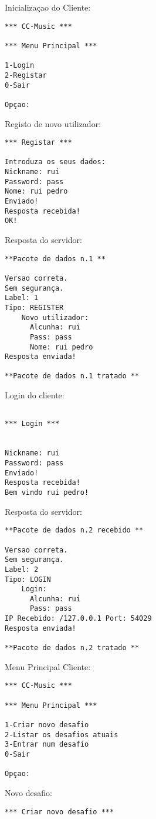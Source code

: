 \begin{multicols}{2}{
\scriptsize
Inicializaçao do Cliente:
\begin{verbatim}
*** CC-Music ***

*** Menu Principal ***

1-Login
2-Registar
0-Sair

Opçao: 
\end{verbatim}

Registo de novo utilizador:
\begin{verbatim}
*** Registar ***

Introduza os seus dados:
Nickname: rui
Password: pass
Nome: rui pedro
Enviado!
Resposta recebida!
OK!
\end{verbatim}

Resposta do servidor:
\begin{verbatim}
**Pacote de dados n.1 **

Versao correta.
Sem segurança.
Label: 1
Tipo: REGISTER
    Novo utilizador:
      Alcunha: rui
      Pass: pass
      Nome: rui pedro
Resposta enviada!

**Pacote de dados n.1 tratado **
\end{verbatim}

Login do cliente:
\begin{verbatim}

*** Login ***


Nickname: rui
Password: pass
Enviado!
Resposta recebida!
Bem vindo rui pedro!
\end{verbatim}

Resposta do servidor:
\begin{verbatim}
**Pacote de dados n.2 recebido **

Versao correta.
Sem segurança.
Label: 2
Tipo: LOGIN
    Login:
      Alcunha: rui
      Pass: pass
IP Recebido: /127.0.0.1 Port: 54029
Resposta enviada!

**Pacote de dados n.2 tratado **
\end{verbatim}

Menu Principal Cliente:
\begin{verbatim}
*** CC-Music ***

*** Menu Principal ***

1-Criar novo desafio
2-Listar os desafios atuais
3-Entrar num desafio
0-Sair

Opçao: 
\end{verbatim}

Novo desafio:
\begin{verbatim}
*** Criar novo desafio ***


\end{verbatim}}
\end{multicols}
